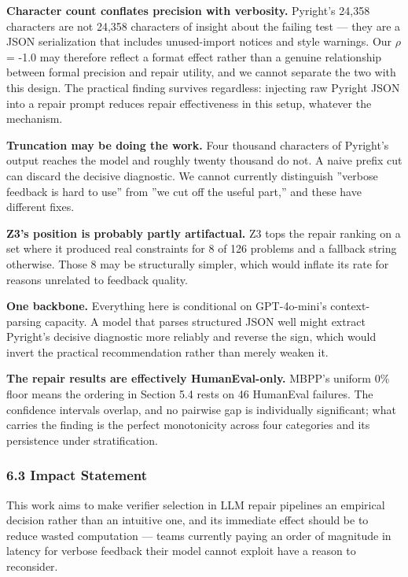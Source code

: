 \textbf{Character count conflates precision with verbosity.} Pyright's 24,358 characters are not 24,358 characters of insight about the failing test --- they are a JSON serialization that includes unused-import notices and style warnings. Our $\rho$ = -1.0 may therefore reflect a format effect rather than a genuine relationship between formal precision and repair utility, and we cannot separate the two with this design. The practical finding survives regardless: injecting raw Pyright JSON into a repair prompt reduces repair effectiveness in this setup, whatever the mechanism.

\textbf{Truncation may be doing the work.} Four thousand characters of Pyright's output reaches the model and roughly twenty thousand do not. A naive prefix cut can discard the decisive diagnostic. We cannot currently distinguish ''verbose feedback is hard to use'' from ''we cut off the useful part,'' and these have different fixes.

\textbf{Z3's position is probably partly artifactual.} Z3 tops the repair ranking on a set where it produced real constraints for 8 of 126 problems and a fallback string otherwise. Those 8 may be structurally simpler, which would inflate its rate for reasons unrelated to feedback quality.

\textbf{One backbone.} Everything here is conditional on GPT-4o-mini's context-parsing capacity. A model that parses structured JSON well might extract Pyright's decisive diagnostic more reliably and reverse the sign, which would invert the practical recommendation rather than merely weaken it.

\textbf{The repair results are effectively HumanEval-only.} MBPP's uniform 0\% floor means the ordering in Section 5.4 rests on 46 HumanEval failures. The confidence intervals overlap, and no pairwise gap is individually significant; what carries the finding is the perfect monotonicity across four categories and its persistence under stratification.

\subsubsection{6.3 Impact Statement}

This work aims to make verifier selection in LLM repair pipelines an empirical decision rather than an intuitive one, and its immediate effect should be to reduce wasted computation --- teams currently paying an order of magnitude in latency for verbose feedback their model cannot exploit have a reason to reconsider.


